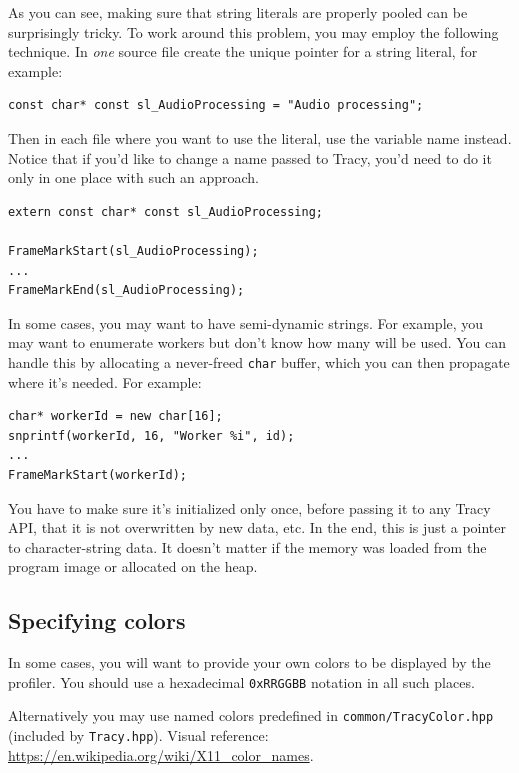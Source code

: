\documentclass[hidelinks,titlepage,a4paper,twoside]{article}
\begin{document}
As you can see, making sure that string literals are properly pooled can be surprisingly tricky. To work around this problem, you may employ the following technique. In \emph{one} source file create the unique pointer for a string literal, for example:

\begin{lstlisting}
const char* const sl_AudioProcessing = "Audio processing";
\end{lstlisting}

Then in each file where you want to use the literal, use the variable name instead. Notice that if you'd like to change a name passed to Tracy, you'd need to do it only in one place with such an approach.

\begin{lstlisting}
extern const char* const sl_AudioProcessing;

FrameMarkStart(sl_AudioProcessing);
...
FrameMarkEnd(sl_AudioProcessing);
\end{lstlisting}

In some cases, you may want to have semi-dynamic strings. For example, you may want to enumerate workers but don't know how many will be used. You can handle this by allocating a never-freed \texttt{char} buffer, which you can then propagate where it's needed. For example:

\begin{lstlisting}
char* workerId = new char[16];
snprintf(workerId, 16, "Worker %i", id);
...
FrameMarkStart(workerId);
\end{lstlisting}

You have to make sure it's initialized only once, before passing it to any Tracy API, that it is not overwritten by new data, etc. In the end, this is just a pointer to character-string data. It doesn't matter if the memory was loaded from the program image or allocated on the heap.

\subsection{Specifying colors}

In some cases, you will want to provide your own colors to be displayed by the profiler. You should use a hexadecimal \texttt{0xRRGGBB} notation in all such places.

Alternatively you may use named colors predefined in \texttt{common/TracyColor.hpp} (included by \texttt{Tracy.hpp}). Visual reference: \url{https://en.wikipedia.org/wiki/X11_color_names}.
\end{document}
